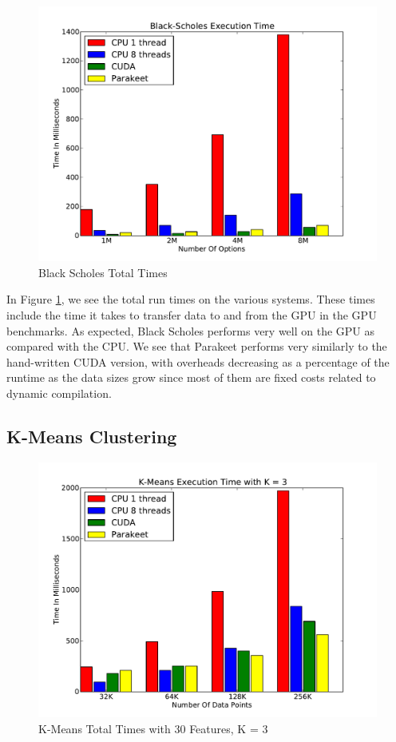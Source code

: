 \documentclass[10pt,twocolumn]{article}
\begin{document}
\begin{figure}[h!]
\includegraphics[scale=0.4]{BSWCPU.pdf}
\caption{Black Scholes Total Times}
\label{BSCPU}
\end{figure}

In Figure \ref{BSCPU}, we see the total run times on the various systems. These times include the time it takes to transfer data to and from the GPU in the GPU benchmarks.  As expected, Black Scholes performs very well on the GPU as compared with the CPU.  We see that Parakeet performs very similarly to the hand-written CUDA version, with overheads decreasing as a percentage of the runtime as the data sizes grow since most of them are fixed costs related to dynamic compilation.

\subsection{K-Means Clustering}
\label{results-k-means}

\begin{figure}
\includegraphics[scale=0.4]{KMCPUK3.pdf}
\caption{K-Means Total Times with 30 Features, K = 3}
\label{KMCPU3}
\end{figure}
\end{document}
